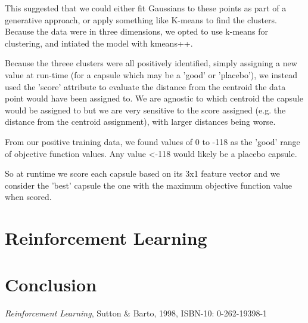 \documentclass[11pt, oneside]{article}   	%
\begin{document}
This suggested that we could either fit Gaussians to these points as part of a generative approach, or apply something like K-means to find the clusters. Because the data were in three dimensions, we opted to use k-means for clustering, and intiated the model with kmeans++.

Because the threee clusters were all positively identified, simply assigning a new value at run-time (for a capsule which may be a 'good' or 'placebo'), we instead used the 'score' attribute to evaluate the distance from the centroid the data point would have been assigned to. We are agnostic to which centroid the capsule would be assigned to but we are very sensitive to the score assigned (e.g. the distance from the centroid assignment), with larger distances being worse.

From our positive training data, we found values of 0 to -118 as the 'good' range of objective function values. Any value <-118 would likely be a placebo capsule.

So at runtime we score each capsule based on its 3x1 feature vector and we consider the 'best' capsule the one with the maximum objective function value when scored.

\section*{Reinforcement Learning}
\section*{Conclusion}


\begin{thebibliography}{1}

 \emph{Reinforcement Learning}, Sutton \& Barto, 1998, ISBN-10: 0-262-19398-1
 
  \end{thebibliography}
\end{document}
